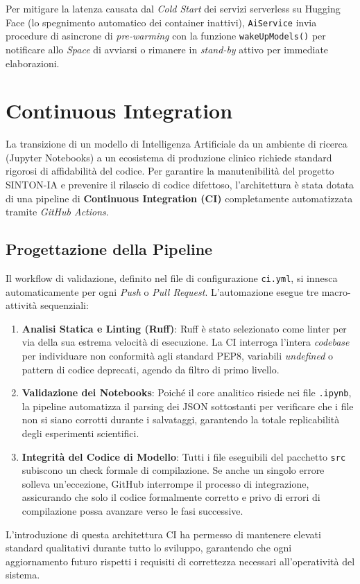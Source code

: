 Per mitigare la latenza causata dal \textit{Cold Start} dei servizi serverless su Hugging Face (lo spegnimento automatico dei container inattivi), \texttt{AiService} invia procedure di asincrone di \textit{pre-warming} con la funzione \texttt{wakeUpModels()} per notificare allo \textit{Space} di avviarsi o rimanere in \textit{stand-by} attivo per immediate elaborazioni.

\section{Continuous Integration}
\label{sec:continuous_integration}

La transizione di un modello di Intelligenza Artificiale da un ambiente di ricerca (Jupyter Notebooks) a un ecosistema di produzione clinico richiede standard rigorosi di affidabilità del codice. Per garantire la manutenibilità del progetto SINTON-IA e prevenire il rilascio di codice difettoso, l'architettura è stata dotata di una pipeline di \textbf{Continuous Integration (CI)} completamente automatizzata tramite \textit{GitHub Actions}.

\subsection{Progettazione della Pipeline}
Il workflow di validazione, definito nel file di configurazione \texttt{ci.yml}, si innesca automaticamente per ogni \textit{Push} o \textit{Pull Request}. L'automazione esegue tre macro-attività sequenziali:

\begin{enumerate}
    \item \textbf{Analisi Statica e Linting (Ruff)}: Ruff è stato selezionato come linter per via della sua estrema velocità di esecuzione. La CI interroga l'intera \textit{codebase} per individuare non conformità agli standard PEP8, variabili \textit{undefined} o pattern di codice deprecati, agendo da filtro di primo livello.
    \item \textbf{Validazione dei Notebooks}: Poiché il core analitico risiede nei file \texttt{.ipynb}, la pipeline automatizza il parsing dei JSON sottostanti per verificare che i file non si siano corrotti durante i salvataggi, garantendo la totale replicabilità degli esperimenti scientifici.
    \item \textbf{Integrità del Codice di Modello}: Tutti i file eseguibili del pacchetto \texttt{src} subiscono un check formale di compilazione. Se anche un singolo errore solleva un'eccezione, GitHub interrompe il processo di integrazione, assicurando che solo il codice formalmente corretto e privo di errori di compilazione possa avanzare verso le fasi successive.
\end{enumerate}

L'introduzione di questa architettura CI ha permesso di mantenere elevati standard qualitativi durante tutto lo sviluppo, garantendo che ogni aggiornamento futuro rispetti i requisiti di correttezza necessari all'operatività del sistema.
